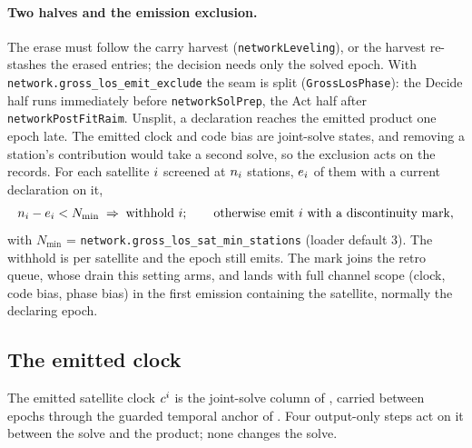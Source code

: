 \documentclass[main.tex]{subfiles}
\begin{document}
\paragraph{Two halves and the emission exclusion.}
The erase must follow the carry harvest (\texttt{networkLeveling}), or
the harvest re-stashes the erased entries; the decision needs only the
solved epoch. With \texttt{network.gross\_los\_emit\_exclude} the seam is
split (\texttt{GrossLosPhase}): the Decide half runs immediately before
\texttt{networkSolPrep}, the Act half after \texttt{networkPostFitRaim}.
Unsplit, a declaration reaches the emitted product one epoch late. The
emitted clock and code bias are joint-solve states, and removing a
station's contribution would take a second solve, so the exclusion acts on
the records. For each satellite $i$ screened at $n_i$ stations,
$e_i$ of them with a current declaration on it,
\begin{equation}
n_i - e_i < N_{\min} \;\Rightarrow\; \text{withhold } i;
\qquad \text{otherwise emit } i \text{ with a discontinuity mark},
\label{eq:wire-gl-exclude}
\end{equation}
with $N_{\min}$ = \texttt{network.gross\_los\_sat\_min\_stations}
(loader default 3). The withhold is per satellite and the epoch still
emits. The mark joins the retro queue, whose drain this setting arms, and
lands with full channel scope (clock, code bias, phase bias) in the
first emission containing the satellite, normally the declaring epoch.

\subsection{The emitted clock}\label{sec:net-wire-clock}

The emitted satellite clock $c^i$ is the joint-solve column of
, carried between epochs through
the guarded temporal anchor of . Four output-only steps act on it between
the solve and the product; none changes the solve.
\end{document}

